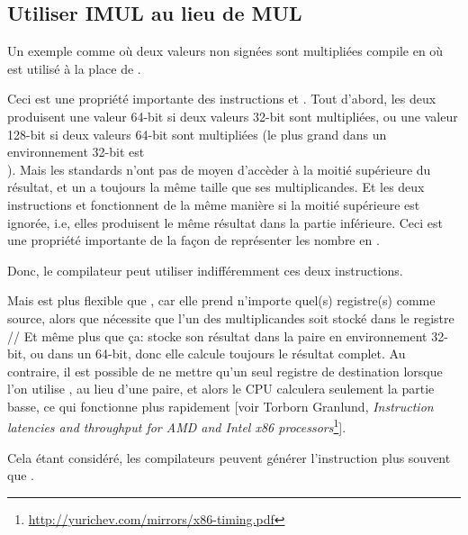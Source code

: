\subsection{Utiliser IMUL au lieu de MUL}
\label{IMUL_over_MUL}

Un exemple comme  où deux valeurs non signées sont multipliées
compile en  où \IMUL est utilisé à la place de \MUL.

Ceci est une propriété importante des instructions \MUL et \IMUL.
Tout d'abord, les deux produisent une valeur 64-bit si deux valeurs 32-bit sont multipliées,
ou une valeur 128-bit si deux valeurs 64-bit sont multipliées (le plus grand 
dans un environnement 32-bit est \\
).
Mais les standards \CCpp n'ont pas de moyen d'accèder à la moitié supérieure du résultat,
et un  a toujours la même taille que ses multiplicandes.
Et les deux instructions \MUL et \IMUL fonctionnent de la même manière si la moitié
supérieure est ignorée, i.e, elles produisent le même résultat dans la partie inférieure.
Ceci est une propriété importante de la façon de représenter les nombre en .

Donc, le compilateur \CCpp peut utiliser indifféremment ces deux instructions.

Mais \IMUL est plus flexible que \MUL, car elle prend n'importe quel(s) registre(s) comme
source, alors que \MUL nécessite que l'un des multiplicandes soit stocké dans le
registre \AX/\EAX/\RAX
Et même plus que ça: \MUL stocke son résultat dans la paire  en environnement
32-bit, ou  dans un 64-bit, donc elle calcule toujours le résultat complet.
Au contraire, il est possible de ne mettre qu'un seul registre de destination lorsque
l'on utilise \IMUL, au lieu d'une paire, et alors le \ac{CPU} calculera seulement
la partie basse, ce qui fonctionne plus rapidement [voir Torborn Granlund,
\emph{Instruction latencies and throughput for AMD and Intel x86 processors}\footnote{\url{http://yurichev.com/mirrors/x86-timing.pdf}}].

Cela étant considéré, les compilateurs \CCpp peuvent générer l'instruction \IMUL
plus souvent que \MUL.

